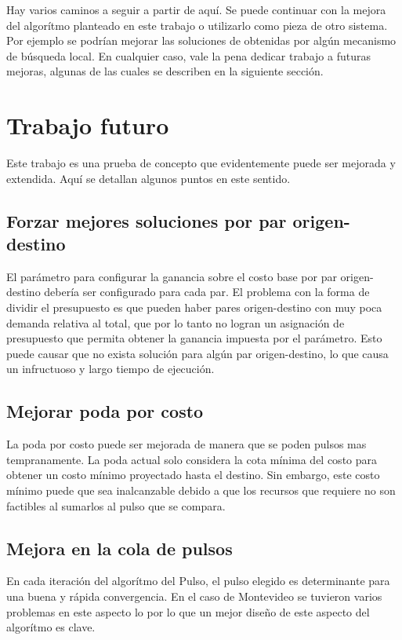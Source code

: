 \documentclass{article}
\begin{document}
  Hay varios caminos a seguir a partir de aquí. Se puede continuar con la mejora del algorítmo planteado en este trabajo o utilizarlo como pieza de otro sistema. Por ejemplo se podrían mejorar las soluciones de obtenidas por algún mecanismo de búsqueda local. En cualquier caso, vale la pena dedicar trabajo a futuras mejoras, algunas de las cuales se describen en la siguiente sección.

  \section*{Trabajo futuro}

  Este trabajo es una prueba de concepto que evidentemente puede ser mejorada y extendida. Aquí se detallan algunos puntos en este sentido.

  \subsection*{Forzar mejores soluciones por par origen-destino}

  El parámetro para configurar la ganancia sobre el costo base por par origen-destino debería ser configurado para cada par. El problema con la forma de dividir el presupuesto es que pueden haber pares origen-destino con muy poca demanda relativa al total, que por lo tanto no logran un asignación de presupuesto que permita obtener la ganancia impuesta por el parámetro. Esto puede causar que no exista solución para algún par origen-destino, lo que causa un infructuoso y largo tiempo de ejecución.

  \subsection*{Mejorar poda por costo}

  La poda por costo puede ser mejorada de manera que se poden pulsos mas tempranamente. La poda actual solo considera la cota mínima del costo para obtener un costo mínimo proyectado hasta el destino. Sin embargo, este costo mínimo puede que sea inalcanzable debido a que los recursos que requiere no son factibles al sumarlos al pulso que se compara.

  \subsection*{Mejora en la cola de pulsos}

  En cada iteración del algorítmo del Pulso, el pulso elegido es determinante para una buena y rápida convergencia. En el caso de Montevideo se tuvieron varios problemas en este aspecto lo por lo que un mejor diseño de este aspecto del algorítmo es clave.
  
\end{document}

